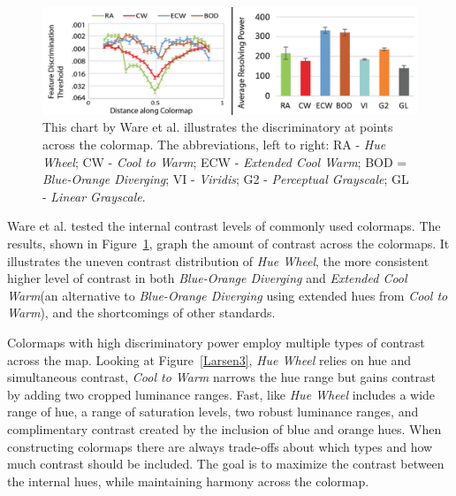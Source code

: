 \documentclass{IEEEcsmag}
\newcommand*{\fs}[1]{\textcolor{fs}{\emph{\textbf{#1} -- FS}}}
\newcommand*{\colormap}[1]{\textsl{#1}\xspace}
\newcommand*{\huewheel}{\colormap{Hue Wheel}}
\newcommand*{\coolwarm}{\colormap{Cool to Warm}}
\newcommand*{\blueorange}{\colormap{Blue-Orange Diverging}}
\newcommand*{\extendedcoolwarm}{\colormap{Extended Cool Warm}}
\begin{document}


\begin{figure}[ht]
\includegraphics[width=\linewidth]{Ware17}
\caption{This chart by Ware et al. \cite{Ware2017} illustrates the discriminatory at points across the colormap. The abbreviations, left to right: RA - \huewheel; CW - \coolwarm; ECW - \extendedcoolwarm; BOD = \blueorange; VI - \colormap{Viridis}; G2 - \colormap{Perceptual Grayscale}; GL - \colormap{Linear Grayscale}. }
\label{fig:ware}
\end{figure}


Ware et al. \cite{Ware2017} tested the internal contrast levels of commonly used colormaps.
The results, shown in Figure~\ref{fig:ware}, graph the amount of contrast across the colormaps.
It illustrates the uneven contrast distribution of \huewheel, the more consistent higher level of contrast in both \blueorange and \extendedcoolwarm (an alternative to \blueorange using extended hues from \coolwarm), and the shortcomings of other standards.



Colormaps with high discriminatory power employ multiple types of contrast across the map.
Looking at Figure~\ref{Larsen3}, \huewheel relies on hue and simultaneous contrast, \coolwarm narrows the hue range but gains contrast by adding two cropped luminance ranges.
Fast, like \huewheel includes a wide range of hue, a range of saturation levels, two robust luminance ranges, and complimentary contrast created by the inclusion of blue and orange hues.
When constructing colormaps there are always trade-offs about which types and how much contrast should be included.
The goal is to maximize the contrast between the internal hues, while maintaining harmony across the colormap.



\end{document}
